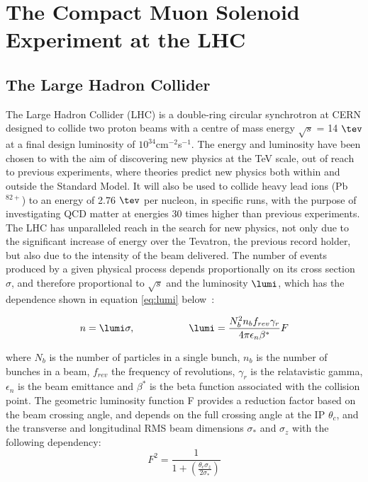 \chapter{The Compact Muon Solenoid Experiment at the LHC}
\section{The Large Hadron Collider}

The Large Hadron Collider (LHC) is a double-ring circular synchrotron at CERN designed to collide two proton beams with a centre of mass energy $\sqrt{s}$  = 14 $\tev$ at a final design luminosity of $10^{34}$cm$^{-2}$s$^{-1}$. The energy and luminosity have been chosen to with the aim of discovering new physics at the TeV scale, out of reach to previous experiments, where theories predict new physics both within and outside the Standard Model. It will also be used to collide heavy lead ions (Pb$^{82+}$) to an energy of 2.76 $\tev$  per nucleon, in specific runs, with the purpose of investigating QCD matter at energies 30 times higher than previous experiments. 
The LHC has unparalleled reach in the search for new physics, not only due to the significant increase of energy over the Tevatron, the previous record holder, but also due to the intensity of the beam delivered. The number of events produced by a given physical process depends proportionally on its cross section $\sigma$, and therefore proportional to $\sqrt{s}$ and the luminosity $\lumi$, which has the dependence shown in equation \ref{eq:lumi} below~\cite{LHCDesign}:

\begin{equation}
n = \lumi \sigma, \hspace{.75in} \lumi = \frac{N_{b}^{2} n_{b} f_{rev} \gamma_{r}}{4 \pi \epsilon_{n} \beta^{*}}F
\label{eq:lumi}
\end{equation}

where $N_{b}$ is the number of particles in a single bunch, $n_{b}$ is the number of bunches in a beam, $f_{rev}$ the frequency of revolutions, $\gamma_{r}$ is the relatavistic gamma, $\epsilon_{n}$ is the beam emittance and $\beta^{*}$ is the beta function associated with the collision point. The geometric luminosity function F provides a reduction factor based on the beam crossing angle, and depends on the full crossing angle at the IP $\theta_{c}$, and the transverse and longitudinal RMS beam dimensions $\sigma_{*}$ and $\sigma_{z}$ with the following dependency:
\begin{equation}
F^{2} = \frac{1}{1+(\frac{\theta_{c} \sigma_{z}}{2\sigma_{*}})}
\label{eq:lumi}
\end{equation}

